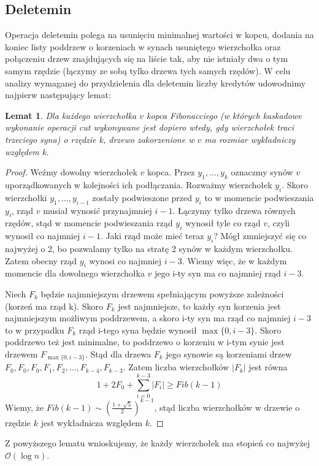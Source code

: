 \documentclass{article}
\newtheorem{lemat}{Lemat}
\begin{document}
\subsection{Deletemin}
Operacja deletemin polega na usunięciu minimalnej wartości w kopcu, dodania na koniec listy poddrzew o korzeniach w synach usuniętego wierzchołka oraz połączeniu drzew znajdujących się na liście tak, aby nie istniały dwa o tym samym rzędzie (łączymy ze sobą tylko drzewa tych samych rzędów). W celu analizy wymaganej do przydzielenia dla deletemin liczby kredytów udowodnimy najpierw następujący lemat:
\begin{lemat}
Dla każdego wierzchołka $v$ kopca Fibonacciego (w których kaskadowe wykonanie operacji cut wykonywane jest dopiero wtedy, gdy wierzchołek traci trzeciego syna) o rzędzie k, drzewo zakorzenione w $v$ ma rozmiar wykładniczy względem k.
\end{lemat}
\begin{proof}
Weźmy dowolny wierzchołek $v$ kopca. Przez $y_1, \ldots, y_k$ oznaczmy synów $v$ uporządkowanych w kolejności ich podłączania. Rozważmy wierzchołek $y_i$. Skoro wierzchołki $y_1,\ldots, y_{i-1}$ zostały podwieszone przed $y_i$ to w momencie podwieszania $y_i$, rząd $v$ musiał wynosić przynajmniej $i-1$. Łączymy tylko drzewa równych rzędów, stąd w momencie podwieszania rząd $y_i$ wynosił tyle co rząd $v$, czyli wynosił co najmniej $i-1$. Jaki rząd może mieć teraz $y_i$? Mógł zmniejszyć się co najwyżej o 2, bo pozwalamy tylko na stratę 2 synów w każdym wierzchołku. Zatem obecny rząd $y_i$ wynosi co najmniej $i-3$. Wiemy więc, że w każdym momencie dla dowolnego wierzchołka $v$ jego i-ty syn ma co najmniej rząd $i-3$.

Niech $F_k$ będzie najmniejszym drzewem spełniającym powyższe zależności (korzeń ma rząd k). Skoro $F_k$ jest najmniejsze, to każdy syn korzenia jest najmniejszym możliwym poddrzewem, a skoro i-ty syn ma rząd co najmniej $i-3$ to w przypadku $F_k$ rząd i-tego syna będzie wynosił $\max \{0, i-3\}$. Skoro poddrzewo też jest minimalne, to poddrzewo o korzeniu w i-tym synie jest drzewem $F_{\max \{0, i-3\}}$. Stąd dla drzewa $F_k$ jego synowie są korzeniami drzew $F_0, F_0, F_0, F_1, F_2, \ldots, F_{k-4}, F_{k-3}$. Zatem liczba wierzchołków $|F_k|$ jest równa $$1 + 2F_0 + \sum_{i=0}^{k-3} |F_i| \geq Fib(k-1)$$ 
Wiemy, że $Fib(k-1) \sim \left(\frac{1+\sqrt{5}}{2}\right)^{k-1}$, stąd liczba wierzchołków w drzewie o rzędzie $k$ jest wykładnicza względem $k$.
\end{proof}
Z powyższego lematu wnioskujemy, że każdy wierzchołek ma stopień co najwyżej $\mathcal{O}(\log{n})$.\\
\end{document}
